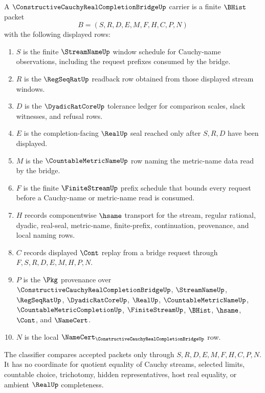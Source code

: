 \begin{definition}
\label{def:constructive-cauchy-real-completion-bridge-carrier}
A $\ConstructiveCauchyRealCompletionBridgeUp$ carrier is a finite $\BHist$ packet
$$
B=(S,R,D,E,M,F,H,C,P,N)
$$
with the following displayed rows:
\begin{enumerate}
\item $S$ is the finite $\StreamNameUp$ window schedule for Cauchy-name observations, including the request prefixes consumed by the bridge.
\item $R$ is the $\RegSeqRatUp$ readback row obtained from those displayed stream windows.
\item $D$ is the $\DyadicRatCoreUp$ tolerance ledger for comparison scales, slack witnesses, and refusal rows.
\item $E$ is the completion-facing $\RealUp$ seal reached only after $S,R,D$ have been displayed.
\item $M$ is the $\CountableMetricNameUp$ row naming the metric-name data read by the bridge.
\item $F$ is the finite $\FiniteStreamUp$ prefix schedule that bounds every request before a Cauchy-name or metric-name read is consumed.
\item $H$ records componentwise $\hsame$ transport for the stream, regular rational, dyadic, real-seal, metric-name, finite-prefix, continuation, provenance, and local naming rows.
\item $C$ records displayed $\Cont$ replay from a bridge request through $F,S,R,D,E,M,H,P,N$.
\item $P$ is the $\Pkg$ provenance over $\ConstructiveCauchyRealCompletionBridgeUp$, $\StreamNameUp$, $\RegSeqRatUp$, $\DyadicRatCoreUp$, $\RealUp$, $\CountableMetricNameUp$, $\CountableMetricCompletionUp$, $\FiniteStreamUp$, $\BHist$, $\hsame$, $\Cont$, and $\NameCert$.
\item $N$ is the local $\NameCert_{\ConstructiveCauchyRealCompletionBridgeUp}$ row.
\end{enumerate}
The classifier compares accepted packets only through $S,R,D,E,M,F,H,C,P,N$. It has no coordinate for quotient equality of Cauchy streams, selected limits, countable choice, trichotomy, hidden representatives, host real equality, or ambient $\RealUp$ completeness.
\end{definition}

